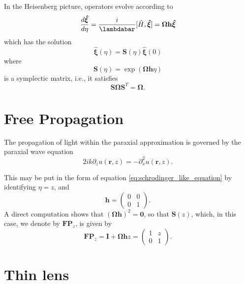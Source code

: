 \documentclass[a4paper,10pt]{report}
\begin{document}
In the Heisenberg picture, operators evolve according to
\begin{equation}
\frac{d\boldsymbol{\hat{\xi}}}{d\eta} = \frac{i}{\lambdabar} [\hat{H}, \boldsymbol{\hat{\xi}}] = \boldsymbol{\Omega} \mathbf{h} \boldsymbol{\hat{\xi}}
\end{equation}
which has the solution
\begin{equation}
\boldsymbol{\hat{\xi}}(\eta) = \mathbf{S}(\eta) \boldsymbol{\hat{\xi}}(0)
\end{equation}
where
\begin{equation}\mathbf{S}(\eta) = \exp(\boldsymbol{\Omega} \mathbf{h} \eta)\end{equation}
is a symplectic matrix, i.e., it satisfies
\begin{equation}\mathbf{S}\boldsymbol{\Omega} \mathbf{S}^T = \boldsymbol{\Omega}.\end{equation}

\section{Free Propagation}

The propagation of light within the paraxial approximation is governed by the paraxial wave equation
\begin{equation}
    2ik\partial_z u(\mathbf{r}, z) = -\partial_x^2 u(\mathbf{r}, z).
\end{equation}

This may be put in the form of equation \eqref{eq:schrodinger_like_equation} by identifying $\eta = z$, and
\begin{equation}
    \mathbf{h} = \begin{pmatrix}
        0 & 0 \\
        0 & 1
    \end{pmatrix} .
\end{equation}
A direct computation shows that $(\boldsymbol{\Omega}\mathbf{h})^2 = \boldsymbol{0}$, so that $\mathbf{S}(z)$, which, in this case, we denote by $\mathbf{FP}_z$, is given by
\begin{equation}
    \mathbf{FP}_z = \boldsymbol{I} + \boldsymbol{\Omega}\mathbf{h} z = \begin{pmatrix}
        1 & z \\
        0 & 1
    \end{pmatrix} .
\end{equation}

\section{Thin lens}
\end{document}
